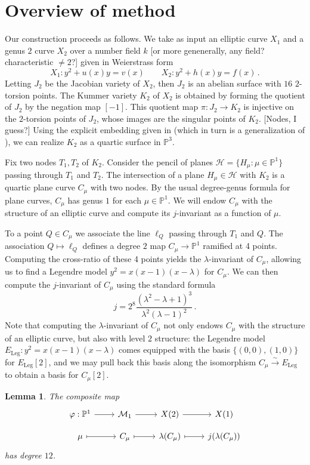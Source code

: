 \documentclass[reqno, 12pt]{amsart}
\newtheorem{lem}{Lemma}
\theoremstyle{definition}
\renewcommand{\P}{\mathbb P}
\newcommand{\sss}[1]{{\color{blue} [#1]}}
\begin{document}
\section{Overview of method}

Our construction proceeds as follows. We take as input an elliptic curve $X_1$ and a genus $2$ curve $X_2$ over a number field $k$ \sss{or more genenerally, any field? characteristic $\neq 2$?} given in Weierstrass form
$$
X_1: y^2 + u(x) y = v(x) \qquad
X_2: y^2 + h(x) y = f(x) \, .
$$
Letting $J_2$ be the Jacobian variety of $X_2$, then $J_2$ is an abelian surface with $16$ $2$-torsion points. The Kummer variety $K_2$ of $X_2$ is obtained by forming the quotient of $J_2$ by the negation map $[-1]$. This quotient map $\pi : J_2 \to K_2$ is injective on the $2$-torsion points of $J_2$, whose images are the singular points of $K_2$. \sss{Nodes, I guess?} Using  the explicit embedding given in \cite{Mueller} (which in turn is a generalization of \cite{CasselsFlynn}), we can realize $K_2$ as a quartic surface in $\P^3$.

Fix two nodes $T_1, T_2$ of $K_2$. Consider the pencil of planes $\mathcal{H} = \{H_\mu : \mu \in \P^1\}$ passing through $T_1$ and $T_2$. The intersection of a plane $H_\mu \in \mathcal{H}$ with $K_2$ is a quartic plane curve $C_\mu$ with two nodes. By the usual degree-genus formula for plane curves, $C_\mu$ has genus $1$ for each $\mu \in \P^1$. We will endow $C_\mu$ with the structure of an elliptic curve and compute its $j$-invariant as a function of $\mu$.

To a point $Q \in C_\mu$ we associate the line $\ell_Q$ passing through $T_1$ and $Q$. The association $Q \mapsto \ell_Q$ defines a degree $2$ map $C_\mu \to \P^1$ ramified at 4 points. Computing the cross-ratio of these 4 points yields the $\lambda$-invariant of $C_\mu$, allowing us to find a Legendre model $y^2 = x(x-1)(x-\lambda)$ for $C_\mu$. We can then compute the $j$-invariant of $C_\mu$ using the standard formula
$$
j = 2^8 \frac{(\lambda^2 - \lambda + 1)^3}{\lambda^2 (\lambda-1)^2}  \, .
$$
Note that computing the $\lambda$-invariant of $C_\mu$ not only endows $C_\mu$ with the structure of an elliptic curve, but also with level $2$ structure: the Legendre model $E_\text{Leg}: y^2 = x(x-1)(x-\lambda)$ comes equipped with the basis $\{(0,0), (1,0)\}$ for $E_\text{Leg}[2]$, and we may pull back this basis along the isomorphism $C_\mu \overset{\sim}{\to} E_\text{Leg}$ to obtain a basis for $C_\mu[2]$.
\begin{lem}
The composite map
%
$$
\begin{tikzcd}[row sep = small]
\varphi: \P^1 \ar[]{r}{} & \mathcal{M}_1 \ar[]{r}{} & X(2) \ar[]{r}{} & X(1)\\ 
\mu \ar[mapsto]{r}{} & C_\mu \ar[mapsto]{r}{} & \lambda(C_\mu) \ar[mapsto]{r}{} & j(\lambda(C_\mu))
\end{tikzcd}
$$
has degree $12$.
\end{lem}
\end{document}
